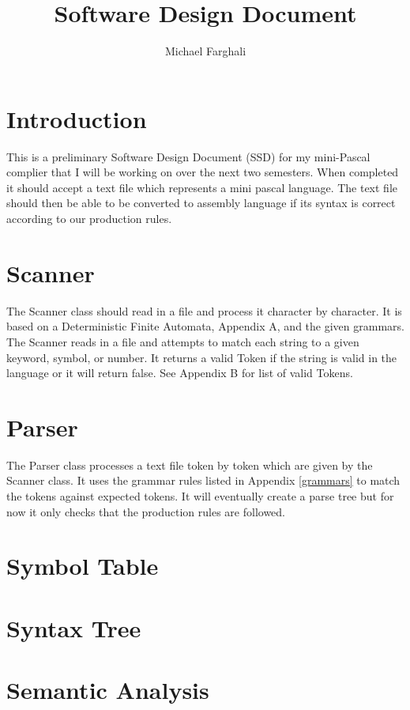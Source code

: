 \documentclass[10]{amsart}
\title{Software Design Document}
\author{Michael Farghali}
\begin{document}
\maketitle



\section{Introduction}
This is a preliminary Software Design Document (SSD) for my mini-Pascal complier that I will be working on over the next two semesters. When completed it should accept a text file which represents a mini pascal language. The text file should then be able to be converted to assembly language if its syntax is correct according to our production rules. 
\section{Scanner}
The Scanner class should read in a file and process it character by character. It is based on a Deterministic Finite Automata, Appendix A, and the given grammars. The Scanner reads in a file and attempts to match each string to a given keyword, symbol, or number. It returns a valid Token if the string is valid in the language or it will return false. See Appendix B for list of valid Tokens.

\section{Parser}
The Parser class processes a text file token by token which are given by the Scanner class. It uses the grammar rules listed in Appendix \ref{grammars} to match the tokens against expected tokens. It will eventually create a parse tree but for now it only checks that the production rules are followed. 

\section{Symbol Table}

\section{Syntax Tree}

\section{Semantic Analysis}
\end{document}

